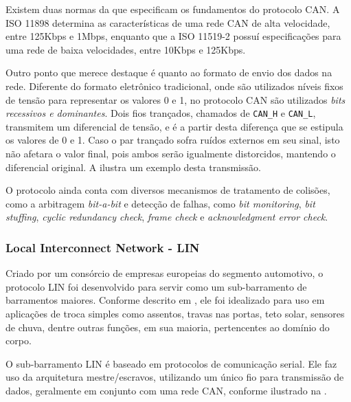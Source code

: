 Existem duas normas da  que especificam os fundamentos do protocolo CAN. A ISO 11898 determina as características de uma rede CAN de alta velocidade, entre 125Kbps e 1Mbps, enquanto que a ISO 11519-2 possuí especificações para uma rede de baixa velocidades, entre 10Kbps e 125Kbps.

Outro ponto que merece destaque é quanto ao formato de envio dos dados na rede. Diferente do formato eletrônico tradicional, onde são utilizados níveis fixos de tensão para representar os valores 0 e 1, no protocolo CAN são utilizados \emph{bits recessivos e dominantes}. Dois fios trançados, chamados de \texttt{CAN\_H} e \texttt{CAN\_L}, transmitem um diferencial de tensão, e é a partir desta diferença que se estipula os valores de 0 e 1. Caso o par trançado sofra ruídos externos em seu sinal, isto não afetara o valor final, pois ambos serão igualmente distorcidos, mantendo o diferencial original. A  ilustra um exemplo desta transmissão.


O protocolo ainda conta com diversos mecanismos de tratamento de colisões, como a arbitragem \emph{bit-a-bit} e detecção de falhas, como \emph{bit monitoring}, \emph{bit stuffing}, \emph{cyclic redundancy check}, \emph{frame check} e \emph{acknowledgment error check}.

\subsubsection{Local Interconnect Network - LIN}
\label{cap:rede_lin}

Criado por um consórcio de empresas europeias do segmento automotivo, o protocolo LIN foi desenvolvido para servir como um sub-barramento de barramentos maiores. Conforme descrito em , ele foi idealizado para uso em aplicações de troca simples como assentos, travas nas portas, teto solar, sensores de chuva, dentre outras funções, em sua maioria, pertencentes ao domínio do corpo.

O sub-barramento LIN é baseado em protocolos de comunicação serial. Ele faz uso da arquitetura mestre/escravos, utilizando um único fio para transmissão de dados, geralmente em conjunto com uma rede CAN, conforme ilustrado na .


